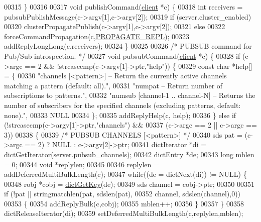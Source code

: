 \begin{DoxyCode}
00315 \}
00316 
00317 \textcolor{keywordtype}{void} publishCommand(\hyperlink{structclient}{client} *c) \{
00318     \textcolor{keywordtype}{int} receivers = pubsubPublishMessage(c->argv[1],c->argv[2]);
00319     \textcolor{keywordflow}{if} (server.cluster\_enabled)
00320         clusterPropagatePublish(c->argv[1],c->argv[2]);
00321     \textcolor{keywordflow}{else}
00322         forceCommandPropagation(c,\hyperlink{server_8h_a59c6e025b4ed85642a0472fc3e73e298}{PROPAGATE\_REPL});
00323     addReplyLongLong(c,receivers);
00324 \}
00325 
00326 \textcolor{comment}{/* PUBSUB command for Pub/Sub introspection. */}
00327 \textcolor{keywordtype}{void} pubsubCommand(\hyperlink{structclient}{client} *c) \{
00328     \textcolor{keywordflow}{if} (c->argc == 2 && !strcasecmp(c->argv[1]->ptr,\textcolor{stringliteral}{"help"})) \{
00329         \textcolor{keyword}{const} \textcolor{keywordtype}{char} *help[] = \{
00330 \textcolor{stringliteral}{"channels [<pattern>] -- Return the currently active channels matching a pattern (default: all)."},
00331 \textcolor{stringliteral}{"numpat -- Return number of subscriptions to patterns."},
00332 \textcolor{stringliteral}{"numsub [channel-1 .. channel-N] -- Returns the number of subscribers for the specified channels
       (excluding patterns, default: none)."},
00333 NULL
00334         \};
00335         addReplyHelp(c, help);
00336     \} \textcolor{keywordflow}{else} \textcolor{keywordflow}{if} (!strcasecmp(c->argv[1]->ptr,\textcolor{stringliteral}{"channels"}) &&
00337         (c->argc == 2 || c->argc == 3))
00338     \{
00339         \textcolor{comment}{/* PUBSUB CHANNELS [<pattern>] */}
00340         sds pat = (c->argc == 2) ? NULL : c->argv[2]->ptr;
00341         dictIterator *di = dictGetIterator(server.pubsub\_channels);
00342         dictEntry *de;
00343         \textcolor{keywordtype}{long} mblen = 0;
00344         \textcolor{keywordtype}{void} *replylen;
00345 
00346         replylen = addDeferredMultiBulkLength(c);
00347         \textcolor{keywordflow}{while}((de = dictNext(di)) != NULL) \{
00348             robj *cobj = \hyperlink{dict_8h_a3271c334309904a3086deca94f96e46e}{dictGetKey}(de);
00349             sds channel = cobj->ptr;
00350 
00351             \textcolor{keywordflow}{if} (!pat || stringmatchlen(pat, sdslen(pat),
00352                                        channel, sdslen(channel),0))
00353             \{
00354                 addReplyBulk(c,cobj);
00355                 mblen++;
00356             \}
00357         \}
00358         dictReleaseIterator(di);
00359         setDeferredMultiBulkLength(c,replylen,mblen);

\end{DoxyCode}
